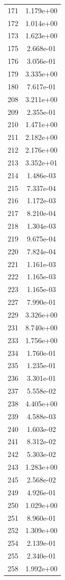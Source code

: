 \documentclass[12pt]{article}
\begin{document}
\begin{longtable}{@{}cc@{}}
171 & 1.179e+00 \\
172 & 1.014e+00 \\
173 & 1.623e+00 \\
175 & 2.668e-01 \\
176 & 3.056e-01 \\
179 & 3.335e+00 \\
180 & 7.617e-01 \\
208 & 3.211e+00 \\
209 & 2.355e-01 \\
210 & 1.471e+00 \\
211 & 2.182e+00 \\
212 & 2.176e+00 \\
213 & 3.352e+01 \\
214 & 1.486e-03 \\
215 & 7.337e-04 \\
216 & 1.172e-03 \\
217 & 8.210e-04 \\
218 & 1.304e-03 \\
219 & 9.675e-04 \\
220 & 7.824e-04 \\
221 & 1.161e-03 \\
222 & 1.165e-03 \\
223 & 1.165e-03 \\
227 & 7.990e-01 \\
229 & 3.326e+00 \\
231 & 8.740e+00 \\
233 & 1.756e+00 \\
234 & 1.760e-01 \\
235 & 1.235e-01 \\
236 & 3.301e-01 \\
237 & 5.558e-02 \\
238 & 4.405e+00 \\
239 & 4.588e-03 \\
240 & 1.603e-02 \\
241 & 8.312e-02 \\
242 & 5.303e-02 \\
243 & 1.283e+00 \\
245 & 2.568e-02 \\
249 & 4.926e-01 \\
250 & 1.029e+00 \\
251 & 8.960e-01 \\
252 & 1.309e+00 \\
254 & 2.139e-01 \\
255 & 2.340e-01 \\
258 & 1.992e+00 \\

\end{longtable}
\end{document}
